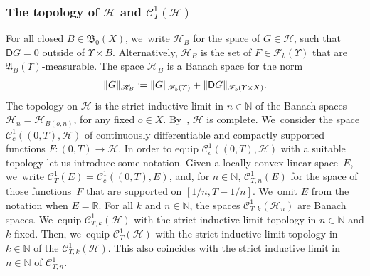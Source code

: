 \documentclass[10pt]{amsart}
\theoremstyle{definition}
\theoremstyle{remark}
\DeclarePairedDelimiter{\norm}{\lVert}{\rVert}
\begin{document}
\subsubsection{The topology of \texorpdfstring{$\mathscr{H}$}{H} and \texorpdfstring{$\mathscr{C}^{1}_{T}(\mathscr{H})$}{H-valued continuously differentiable functions}}
For all closed $B \in \mathfrak{B}_{0}(X)$, we~write $\mathscr{H}_{B}$ for the space of $G \in \mathscr{H}$, such that $\mathsf{D} G = 0$ outside of $\varUpsilon \times B$.
Alternatively, $\mathscr{H}_{B}$ is the set of $F \in \mathscr{F}_{b}(\varUpsilon)$ that are $\mathfrak{A}_{B}(\varUpsilon)$-measurable.
The space $\mathscr{H}_{B}$ is a Banach space for the norm
\begin{equation*}
\norm{G}_{\mathscr{H}_{B}} \coloneq \norm{G}_{\mathscr{F}_{b}(\varUpsilon)} + \norm{\mathsf{D} G}_{\mathscr{F}_{b}(\varUpsilon \times X)}.
\end{equation*}
The topology on $\mathscr{H}$ is the strict inductive limit in $n \in \mathbb{N}$ of the Banach spaces $\mathscr{H}_{n} = \mathscr{H}_{B(o,n)}$, for any fixed $o \in X$.
By~\cite[Prop.\,9(iii), p.\,II.34]{BourbakiEVT}, $\mathscr{H}$ is complete. We~consider the space $\mathscr{C}_{c}^{1}((0,T), \mathscr{H})$ of continuously differentiable and compactly supported functions $F \colon (0,T) \to \mathscr{H}$.
In order to equip $\mathscr{C}_{c}^{1}((0,T), \mathscr{H})$ with a suitable topology let us introduce some notation.
Given a locally convex linear space~$E$, we~write $\mathscr{C}^{1}_{T}(E) = \mathscr{C}_{c}^{1}((0,T), E)$, and, for $n \in \mathbb{N}$, $\mathscr{C}^{1}_{T,n}(E)$ for the space of those functions~$F$ that are supported on $[1/n, T-1/n]$. We~omit $E$ from the notation when $E = \mathbb{R}$.
For all $k$ and $n \in \mathbb{N}$, the spaces $\mathscr{C}^{1}_{T,k}(\mathscr{H}_{n})$ are Banach spaces. We~equip $\mathscr{C}^{1}_{T,k}(\mathscr{H})$ with the strict inductive-limit topology in $n \in \mathbb{N}$ and $k$ fixed.
Then, we~equip $\mathscr{C}^{1}_{T}(\mathscr{H})$ with the strict inductive-limit topology in $k \in \mathbb{N}$ of the $\mathscr{C}^{1}_{T,k}(\mathscr{H})$.
This also coincides with the strict inductive limit in $n \in \mathbb{N}$ of $\mathscr{C}^{1}_{T,n}$.
\end{document}
